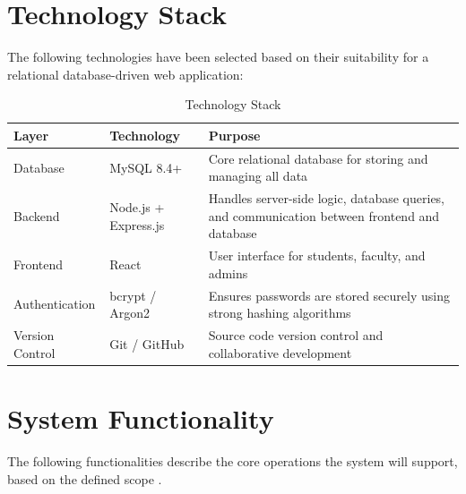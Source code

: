 \documentclass[12pt, a4paper]{report}
\begin{document}
\section{Technology Stack}

The following technologies have been selected based on their suitability for a relational database-driven web application:

\vspace{0.5em}
\begin{table}[H]
\centering
\small
\begin{tabular}{@{} p{2.5cm} p{2.5cm} p{8.5cm} @{}}
\toprule
\textbf{Layer}          & \textbf{Technology}       & \textbf{Purpose}                          \\
\midrule
Database       & MySQL 8.4+                & Core relational database for storing and managing all data \\
\addlinespace
Backend        & Node.js + Express.js      & Handles server-side logic, database queries, and communication between frontend and database \\
\addlinespace
Frontend       & React                 & User interface for students, faculty, and admins \\
\addlinespace
Authentication & bcrypt / Argon2           & Ensures passwords are stored securely using strong hashing algorithms \\
\addlinespace
Version Control& Git / GitHub             & Source code version control and collaborative development \\
\bottomrule
\end{tabular}
\caption{Technology Stack}
\label{tab:technology-stack}
\end{table}

\section{System Functionality}
The following functionalities describe the core operations the system will support, based on the defined scope \cite{srs}.
\end{document}
